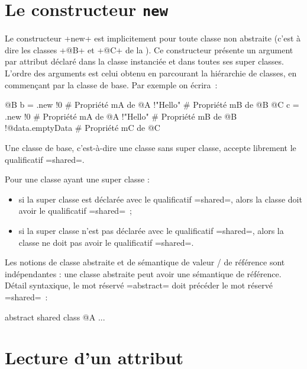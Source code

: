 \section{Le constructeur \texttt{new}}

Le constructeur \ggs+new+ est implicitement pour toute classe non abstraite (c'est à dire les classes \ggs+@B+ et \ggs+@C+ de la ). Ce constructeur présente un argument par attribut déclaré dans la classe instanciée et dans toutes ses super classes. L'ordre des arguments est celui obtenu en parcourant la hiérarchie de classes, en commençant par la classe de base. Par exemple on écrira~:

\begin{galgas}
@B b = .new {
  !0 # Propriété mA de @A
  !"Hello" # Propriété mB de @B
}
@C c = .new {
  !0 # Propriété mA de @A
  !"Hello" # Propriété mB de @B
  !@data.emptyData # Propriété mC de @C
}
\end{galgas}









Une classe de base, c'est-à-dire une classe sans super classe, accepte librement le qualificatif \ggs=shared=.

Pour une classe ayant une super classe :
\begin{itemize}
  \item si la super classe est déclarée avec le qualificatif \ggs=shared=, alors la classe doit avoir le qualificatif \ggs=shared=~;
  \item si la super classe n'est pas déclarée avec le qualificatif \ggs=shared=, alors la classe ne doit pas avoir le qualificatif \ggs=shared=.
\end{itemize}

Les notions de classe abstraite et de sémantique de valeur / de référence sont indépendantes : une classe abstraite peut avoir une sémantique de référence. Détail syntaxique, le mot réservé \ggs=abstract= doit précéder le mot réservé \ggs=shared=~:

abstract shared class @A {
  ...
}








\section{Lecture d'un attribut}

